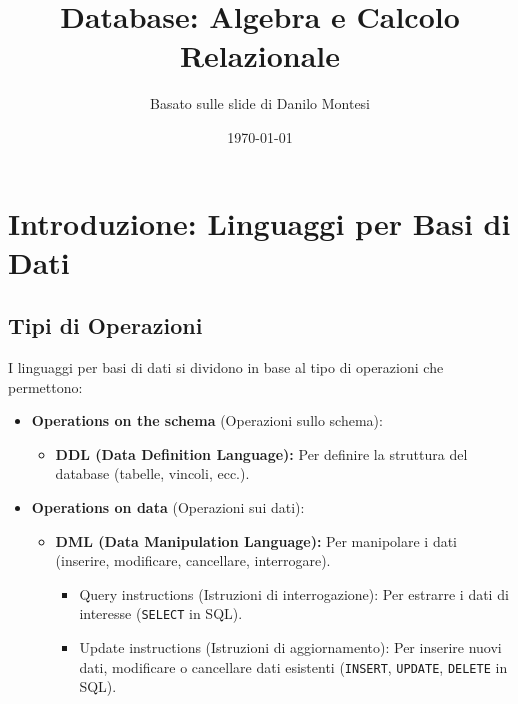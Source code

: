 \documentclass{article}
\title{Database: Algebra e Calcolo Relazionale}
\author{Basato sulle slide di Danilo Montesi}
\date{\today}
\begin{document}
	
	\maketitle
	
	\section{Introduzione: Linguaggi per Basi di Dati}
	
	\subsection{Tipi di Operazioni}
	I linguaggi per basi di dati si dividono in base al tipo di operazioni che permettono:
	\begin{itemize}
		\item \textbf{Operations on the schema} (Operazioni sullo schema):
		\begin{itemize}
			\item \textbf{DDL (Data Definition Language):} Per definire la struttura del database (tabelle, vincoli, ecc.).
		\end{itemize}
		\item \textbf{Operations on data} (Operazioni sui dati):
		\begin{itemize}
			\item \textbf{DML (Data Manipulation Language):} Per manipolare i dati (inserire, modificare, cancellare, interrogare).
			\begin{itemize}
				\item Query instructions (Istruzioni di interrogazione): Per estrarre i dati di interesse (\texttt{SELECT} in SQL).
				\item Update instructions (Istruzioni di aggiornamento): Per inserire nuovi dati, modificare o cancellare dati esistenti (\texttt{INSERT}, \texttt{UPDATE}, \texttt{DELETE} in SQL).
			\end{itemize}
		\end{itemize}
	\end{itemize}
	
\end{document}
